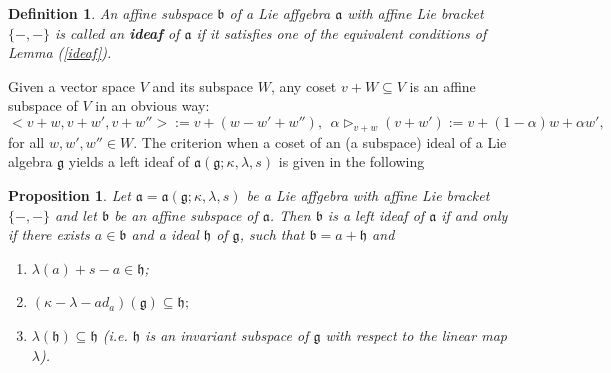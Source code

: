 \documentclass{article}
\newtheorem{definition}{Definition}[section]
\newtheorem{prop}{Proposition}[section]
\theoremstyle{definition}
\theoremstyle{remark}
\theoremstyle{plain}
\begin{document}
    \begin{definition}
         An affine subspace $\mathfrak{b}$ of a Lie affgebra $\mathfrak{a}$ with affine Lie bracket $\{-, -\}$ is called an \textbf{ideaf} of $\mathfrak{a}$ if it satisfies one of the equivalent conditions of Lemma (\ref{ideaf}).
    \end{definition}
    Given a vector space $V$ and its subspace $W$, any coset $v+W \subseteq V$ is an affine subspace of $V$ in an obvious way:
    $$<v+w, v+w', v+w''>:=v+(w-w'+w''),~~ \alpha \triangleright_{v+w}(v+w'):=v+(1-\alpha)w+ \alpha w',$$ for all $w, w', w'' \in W.$ The criterion when a coset of an (a subspace) ideal of a Lie algebra $\mathfrak{g}$ yields a left ideaf of $\mathfrak{a}(\mathfrak{g}; \kappa, \lambda, s)$ is given in the following
    \begin{prop}\label{1}
        Let $\mathfrak{a}=\mathfrak{a}(\mathfrak{g}; \kappa, \lambda, s)$ be a Lie affgebra with affine Lie bracket $\{-, -\}$ and let $\mathfrak{b}$ be an affine subspace of $\mathfrak{a}$. Then $\mathfrak{b}$ is a left ideaf of $\mathfrak{a}$ if and only if there exists $a\in \mathfrak{b}$ and a ideal $\mathfrak{h}$ of $\mathfrak{g}$, such that $\mathfrak{b}=a+\mathfrak{h}$ and 
        \begin{enumerate}
            \item $\lambda(a)+s-a \in \mathfrak{h}$;
            \item $(\kappa - \lambda - ad_{a})(\mathfrak{g})\subseteq \mathfrak{h};$
            \item $\lambda (\mathfrak{h})\subseteq \mathfrak{h}$ (i.e. $\mathfrak{h}$ is an invariant subspace of $\mathfrak{g}$ with respect to the linear map $\lambda$).
        \end{enumerate}
    \end{prop}
\end{document}
